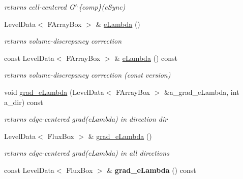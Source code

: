 \begin{DoxyCompactItemize}
\begin{DoxyCompactList}\small\item\em returns cell-\/centered G$^\wedge$\{comp\}(e\-Sync) \end{DoxyCompactList}\item 
\hypertarget{class_c_c_projector_comp_a720ea56221668e2907355b68375b85e8}{Level\-Data$<$ F\-Array\-Box $>$ \& \hyperlink{class_c_c_projector_comp_a720ea56221668e2907355b68375b85e8}{e\-Lambda} ()}\label{class_c_c_projector_comp_a720ea56221668e2907355b68375b85e8}

\begin{DoxyCompactList}\small\item\em returns volume-\/discrepancy correction \end{DoxyCompactList}\item 
\hypertarget{class_c_c_projector_comp_a6b6a8fbf193f12c59dd810ae9ff29347}{const Level\-Data$<$ F\-Array\-Box $>$ \& \hyperlink{class_c_c_projector_comp_a6b6a8fbf193f12c59dd810ae9ff29347}{e\-Lambda} () const }\label{class_c_c_projector_comp_a6b6a8fbf193f12c59dd810ae9ff29347}

\begin{DoxyCompactList}\small\item\em returns volume-\/discrepancy correction (const version) \end{DoxyCompactList}\item 
\hypertarget{class_c_c_projector_comp_a6dc2e8a8ad82134682dc91210f9c8828}{void \hyperlink{class_c_c_projector_comp_a6dc2e8a8ad82134682dc91210f9c8828}{grad\-\_\-e\-Lambda} (Level\-Data$<$ F\-Array\-Box $>$ \&a\-\_\-grad\-\_\-e\-Lambda, int a\-\_\-dir) const }\label{class_c_c_projector_comp_a6dc2e8a8ad82134682dc91210f9c8828}

\begin{DoxyCompactList}\small\item\em returns edge-\/centered grad(e\-Lambda) in direction dir \end{DoxyCompactList}\item 
Level\-Data$<$ Flux\-Box $>$ \& \hyperlink{class_c_c_projector_comp_abcdea72f7eb4486a670b36a59e405fbd}{grad\-\_\-e\-Lambda} ()
\begin{DoxyCompactList}\small\item\em returns edge-\/centered grad(e\-Lambda) in all directions \end{DoxyCompactList}\item 
\hypertarget{class_c_c_projector_comp_a02336a4973d3e43be4dfc9f0cd3aa101}{const Level\-Data$<$ Flux\-Box $>$ \& {\bfseries grad\-\_\-e\-Lambda} () const }\label{class_c_c_projector_comp_a02336a4973d3e43be4dfc9f0cd3aa101}


\end{DoxyCompactItemize}
